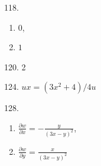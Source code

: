 \documentclass[11pt]{amsbook}
\begin{document}
\begin{hEnumerateArabic}
\item[118.]
  \begin{multicols}{2}
    \begin{enumerate}[label={}]
      \item $0$,
      \item $1$
    \end{enumerate}
  \end{multicols}

\item[120.] 2
\\

\item[124.] $ux = (3x^2 + 4)/4u$
\\

\item[128.]
  \begin{multicols}{2}
    \begin{enumerate}[label={}]
      \item $\frac{\partial w}{\partial x} = -\frac{y}{(3x-y)^2}$,
      \item $\frac{\partial w}{\partial y} = \frac{x}{(3x-y)^2}$
    \end{enumerate}
  \end{multicols}

\end{hEnumerateArabic}
\end{document}
